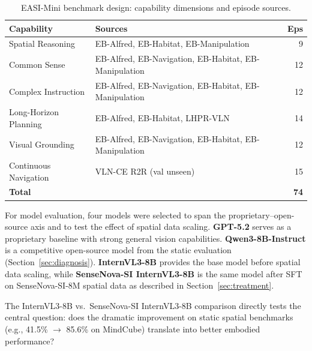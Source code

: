 \documentclass[
hf,
]{confart}
\begin{document}
\begin{table}[htbp]
\centering
\caption{EASI-Mini benchmark design: capability dimensions and episode sources.}
\label{tab:easimini_design}
\renewcommand{\arraystretch}{1.1}
\small
\begin{tabular}{lp{4.5cm}r}
\toprule
\textbf{Capability} & \textbf{Sources} & \textbf{Eps} \\
\midrule
Spatial Reasoning & EB-Alfred, EB-Habitat, EB-Manipulation & 9 \\
Common Sense & EB-Alfred, EB-Navigation, EB-Habitat, EB-Manipulation & 12 \\
Complex Instruction & EB-Alfred, EB-Navigation, EB-Habitat, EB-Manipulation & 12 \\
Long-Horizon Planning & EB-Alfred, EB-Habitat, LHPR-VLN & 14 \\
Visual Grounding & EB-Alfred, EB-Navigation, EB-Habitat, EB-Manipulation & 12 \\
Continuous Navigation & VLN-CE R2R (val unseen) & 15 \\
\midrule
\textbf{Total} & & \textbf{74} \\
\bottomrule
\end{tabular}
\end{table}

For model evaluation, four models were selected to span the proprietary--open-source axis and to test the effect of spatial data scaling. \textbf{GPT-5.2} serves as a proprietary baseline with strong general vision capabilities. \textbf{Qwen3-8B-Instruct} is a competitive open-source model from the static evaluation (Section~\ref{sec:diagnosis}). \textbf{InternVL3-8B} provides the base model before spatial data scaling, while \textbf{SenseNova-SI InternVL3-8B} is the same model after SFT on SenseNova-SI-8M spatial data as described in Section~\ref{sec:treatment}.

The InternVL3-8B vs.\ SenseNova-SI InternVL3-8B comparison directly tests the central question: does the dramatic improvement on static spatial benchmarks (e.g., 41.5\% $\to$ 85.6\% on MindCube) translate into better embodied performance?
\end{document}
